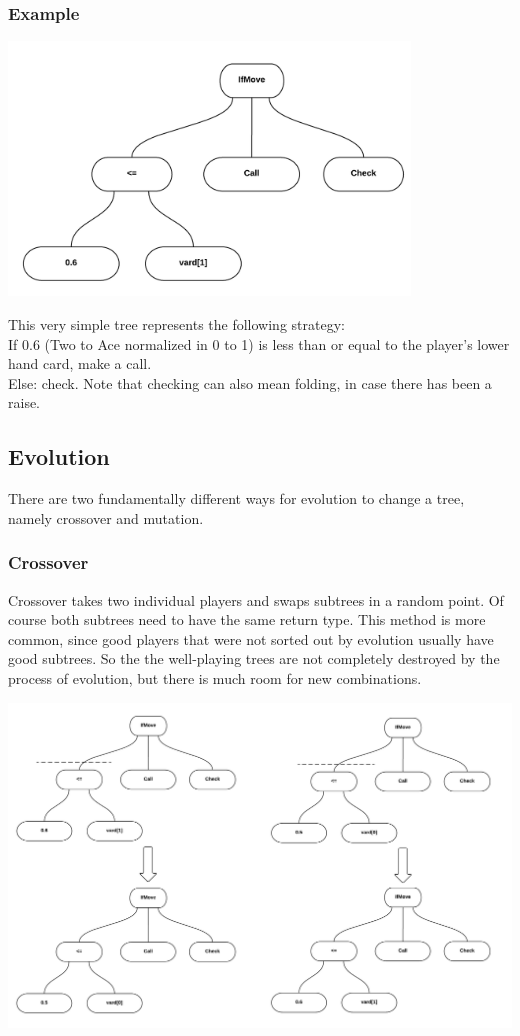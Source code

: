 \documentclass[12pt,fleqn,a4paper]{article}
\begin{document}
\subsubsection{Example}
\begin{center}
	\includegraphics[width=0.8\textwidth]{tree1.png}
\end{center}
This very simple tree represents the following strategy:
~\\
If 0.6 (Two to Ace normalized in 0 to 1) is less than or equal to the player's lower hand card, make a call.\\
Else: check. Note that checking can also mean folding, in case there has been a raise.

\subsection{Evolution}
There are two fundamentally different ways for evolution to change a tree, namely crossover and mutation.

\subsubsection{Crossover}
Crossover takes two individual players and swaps subtrees in a random point.
Of course both subtrees need to have the same return type.
This method is more common, since good players that were not sorted out by evolution usually have good subtrees.
So the the well-playing trees are not completely destroyed by the process of evolution, but there is much room for new combinations.

\begin{center}
	\includegraphics[width=1.0\textwidth]{tree_crossover.png}
\end{center}
\end{document}
